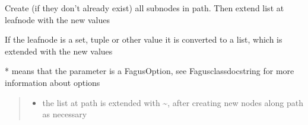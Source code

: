 \documentclass[a4paper,10pt,english]{sphinxmanual}
\begin{document}
\begin{fulllineitems}
\begin{fulllineitems}
\label{\detokenize{fagus.fagus:fagus.fagus.Fagus.extend}}
\pysigstartsignatures
{}
\pysigstopsignatures
\sphinxAtStartPar
Create (if they don’t already exist) all sub\sphinxhyphen{}nodes in path. Then extend list at leaf\sphinxhyphen{}node with the new values

\sphinxAtStartPar
If the leaf\sphinxhyphen{}node is a set, tuple or other value it is converted to a list, which is extended with the new values

\sphinxAtStartPar
* means that the parameter is a FagusOption, see Fagus\sphinxhyphen{}class\sphinxhyphen{}docstring for more information about options
\begin{quote}\begin{description}
\begin{itemize}
\item {}
\sphinxAtStartPar
{} \textendash{} the list at path is extended with \textasciitilde{}, after creating new nodes along path as necessary


\end{itemize}
\end{description}
\end{quote}
\end{fulllineitems}
\end{fulllineitems}
\end{document}
